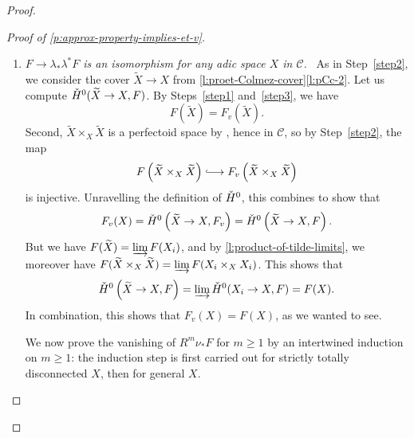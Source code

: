 \documentclass[10pt,a4paper]{article}
\theoremstyle{definition}
\theoremstyle{remark}
\newcommand*{\longhookrightarrow}{\lhook\joinrel\longrightarrow}
\newcommand{\wt}{\widetilde}
\newcommand{\cH}{{\ifmmode \check{H}\else{\v{C}ech}\fi}}
\newcommand{\Dmd}{\mathrm{Dmd}}
\newcommand{\supth}[1]{\ensuremath{#1^{\mathrm{th}}}}
\numberwithin{equation}{section}
\begin{document}
\begin{proof}
\begin{proof}[Proof of \cref{p:approx-property-implies-et-v}]
\begin{enumerate}[label={\emph{Step}~\arabic*:}, ref=\arabic*,wide]
		We are not quite done yet because we do not require $Y_i\to X$ to be a cover in $\mathcal C$. To resolve this, observe that we can endow $\mathcal C$ with a ``smooth'' topology $\mathcal C_{\mathrm{sm}}$ for which we define covers to be the surjective morphisms $U\to V$ that are locally given by a composition $U\to V\times \mathbb B^d\to V$, where the first map is \'etale and the second map is the projection. This indeed defines a site, and this ``smooth'' topology clearly refines the \'etale one. We conclude that $\lambda\colon \Dmd_{K,v}\to \mathcal C$ factors through a morphism of sites $\mu\colon \mathcal C_{\mathrm{sm}}\to \mathcal C$. However, since $X$ is strictly totally disconnected, any cover of $X$ in $\mathcal C_{\mathrm{sm}}$ admits an \'etale refinement. For this reason, we see directly from the explicit definition of the sheafification in terms of the iteratively formed colimit of the $\supth{0}$ \v{C}ech cohomology over all covers  (see \textit{e.g.}~\cite[Tag~00W1]{StacksProject}) that $\mu^{\ast}\mathcal F(X)=\mathcal F(X)$. Since $\cH^0(Y_i\to X,F)\to F_v(X)$ factors through $\cH^0(Y_i\to X,\mu^\ast F)=\mu^{\ast}\mathcal F(X)$, this shows that $\alpha$ lies in the image of $F(X)\to F_v(X)$.
		
\item\label{step4} \emph{$F\to \lambda_{\ast}\lambda^{\ast}F$ is an isomorphism for any adic space $X$ in $\mathcal C$.}~
		As in Step~\ref{step2}, we consider the cover $\wt X\to X$ from \cref{l:proet-Colmez-cover}\eqref{l:pCc-2}. Let us compute $\cH^0(\wt X\to X,F)$. By Steps~\ref{step1} and~\ref{step3}, we have 
		\[ F\left(\wt X\right)=F_v\left(\wt X\right).\]
		Second, $\wt X\times_X\wt X$ is a perfectoid space by , hence in $\mathcal C$, so by Step~\ref{step2}, the map
		\[F\left(\wt X\times_X\wt X\right)\longhookrightarrow F_v\left(\wt X\times_X\wt X\right)\]
		is injective. Unravelling the definition of $\cH^0$, this combines to show that
		\[F_v(X)=\cH^0\left(\wt X\to X,F_v\right)=\cH^0\left(\wt X\to X,F\right).\]
		But we have $F(\wt X)=\varinjlim F(X_i)$, and by \cref{l:product-of-tilde-limits}, we moreover have $F(\wt X\times_X\wt X)=\varinjlim F(X_i\times_XX_i)$. This shows that
		\[
		\cH^0\left(\wt X\to X,F\right)=\varinjlim \cH^0(X_i\to X,F)=F(X).\]
		In combination, this shows that $F_v(X)=F(X)$, as we wanted to see.
		
		\medskip 
		
		We now prove the vanishing of $R^m\nu_{\ast}F$ for $m\geq 1$ by an intertwined induction on $m\geq 1$: the induction step is first carried out for strictly totally disconnected $X$, then for general $X$.
		


\end{enumerate}
\end{proof}
\end{proof}
\end{document}
